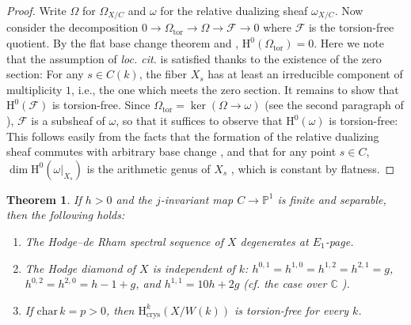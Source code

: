 \documentclass[11pt, letterpaper]{amsart}
\theoremstyle{plain}
\newtheorem{theorem}{Theorem}[section]
\theoremstyle{definition}
\newcommand{\IC}{\mathbb{C}}
\newcommand{\IP}{\mathbb{P}}
\newcommand{\<}{\langle}
\renewcommand{\>}{\rangle}
\newcommand{\sF}{\mathcal{F}}
\newcommand{\w}{\omega}
\renewcommand{\H}{\mathrm{H}}
\newcommand{\crys}{\mathrm{crys}}
\begin{document}
\begin{proof}
    Write $\Omega$ for $\Omega_{X/C}$ and $\w$ for the relative dualizing sheaf $\w_{X/C}$. 
    Now consider the decomposition $0 \to \Omega_{\mathrm{tor}} \to \Omega \to \sF \to 0$ where $\sF$ is the torsion-free quotient. By the flat base change theorem and \cite[Prop.~1]{LiuSaito}, $\H^0(\Omega_{\mathrm{tor}}) = 0$. 
    Here we note that the assumption of \textit{loc. cit.} is satisfied thanks to the existence of the zero section: For any $s \in C(k)$, the fiber $X_s$ has at least an irreducible component of multiplicity $1$, i.e., the one which meets the zero section. 
    It remains to show that $\H^0(\sF)$ is torsion-free. Since $\Omega_{\mathrm{tor}} = \ker(\Omega \to \w)$ (see the second paragraph of \cite[\S 1]{LiuSaito}), $\sF$ is a subsheaf of $\w$, so that it suffices to observe that $\H^0(\w)$ is torsion-free: This follows easily from the facts that the formation of the relative dualizing sheaf commutes with arbitrary base change \cite[\href{https://stacks.math.columbia.edu/tag/0E6R}{Tag 0E6R}]{stacks-project}, and that for any point $s \in C$, $\dim \H^0(\w|_{X_s})$ is the arithmetic genus of $X_s$ \cite[\href{https://stacks.math.columbia.edu/tag/0BS2}{Tag 0BS2(5)}]{stacks-project}, which is constant by flatness.
\end{proof}
\begin{theorem}\label{thm: Hodge diamond of elliptic surface} If $h > 0$ and the $j$-invariant map $C \to \IP^1$ is finite and separable, then the following holds: 
    \begin{enumerate}[label=\upshape{(\alph*)}]
        \item The Hodge--de Rham spectral sequence of $X$ degenerates at $E_1$-page. 
        \item The Hodge diamond of $X$ is independent of $k$: $h^{0, 1} = h^{1, 0} = h^{1, 2} = h^{2, 1} = g$, $h^{0, 2} = h^{2, 0} = h - 1 + g$, and $h^{1,1} = 10h + 2g$ (cf. the case over $\IC$ \cite[Lem.~IV.1.1]{Miranda}). 
        \item If $\mathrm{char\,} k = p > 0$, then $\H^k_\crys(X/W(k))$ is torsion-free for every $k$. 
    \end{enumerate} 
\end{theorem}
\end{document}

